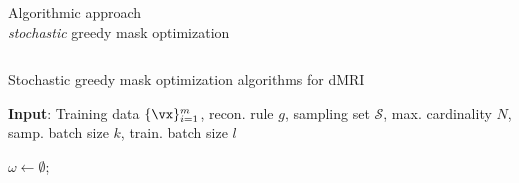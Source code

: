 \begin{frame}{Algorithmic approach\\[-3mm] {\normalsize \textit{stochastic} greedy mask optimization}}
\begin{columns}[T]
\vspace{-.6cm}
\begin{algorithm}[H]
\caption{Stochastic greedy mask optimization algorithms for dMRI \parencite{sanchez2019scalable}}\label{alg:1}
{\footnotesize  \textbf{Input}: Training data $\{\vx\}_{i=1}^m$, recon. rule $g$, sampling set $\mathcal{S}$, max. cardinality $N$,  {\color{red} samp. batch size $k$, train. batch size $l$}} %
\begin{algorithmic}[1]
\State $\omega \leftarrow \emptyset$;
        
     

\end{algorithmic}
\end{algorithm}
\end{columns}
\end{frame}
